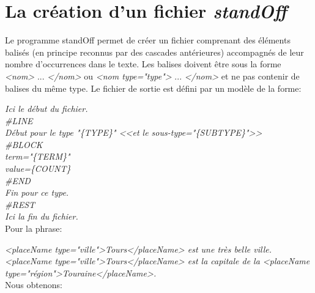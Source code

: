 
\section{La création d'un fichier \textit{standOff}}

Le programme standOff permet de créer un fichier comprenant des éléments balisés (en principe reconnus par des cascades antérieures) accompagnés de leur nombre d'occurrences dans le texte. Les balises doivent être sous la forme \emph{<nom>} ... \emph{</nom>} ou \emph{<nom type="type">} ... \emph{</nom>} et ne pas contenir de balises du même type. Le fichier de sortie est défini par un modèle de la forme:

\bigskip
\noindent \emph{Ici le début du fichier.}\\
\emph{\#LINE}\\
\hspace*{1cm} \emph{Début pour le type "\{TYPE\}" <<et le sous-type="\{SUBTYPE\}">>}\\
\emph{\#BLOCK}\\
\hspace*{1cm} \emph{term="\{TERM\}"}\\
\hspace*{1cm} \emph{value=\{COUNT\}}\\
\emph{\#END}\\
\hspace*{1cm} \emph{Fin pour ce type.}\\
\emph{\#REST}\\
\emph{Ici la fin du fichier.}\\


\noindent Pour la phrase:

\bigskip
\noindent \emph{<placeName type="ville">Tours</placeName> est une très belle ville. <placeName type="ville">Tours</placeName> est la capitale de la <placeName type="région">Touraine</placeName>.}\\

Nous obtenons:

